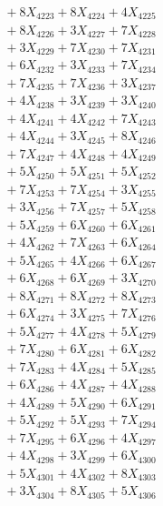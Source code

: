 \documentclass[a4paper,10pt]{article}
\begin{document}
{\begin{align}
&\;  + 8 X_{4223} + 8 X_{4224} + 4 X_{4225} \\[0.3ex]
&\;  + 8 X_{4226} + 3 X_{4227} + 7 X_{4228} \\[0.3ex]
&\;  + 3 X_{4229} + 7 X_{4230} + 7 X_{4231} \\[0.3ex]
&\;  + 6 X_{4232} + 3 X_{4233} + 7 X_{4234} \\[0.3ex]
&\;  + 7 X_{4235} + 7 X_{4236} + 3 X_{4237} \\[0.3ex]
&\;  + 4 X_{4238} + 3 X_{4239} + 3 X_{4240} \\[0.5ex]\allowbreak
&\;  + 4 X_{4241} + 4 X_{4242} + 7 X_{4243} \\[0.3ex]
&\;  + 4 X_{4244} + 3 X_{4245} + 8 X_{4246} \\[0.3ex]
&\;  + 7 X_{4247} + 4 X_{4248} + 4 X_{4249} \\[0.3ex]
&\;  + 5 X_{4250} + 5 X_{4251} + 5 X_{4252} \\[0.3ex]
&\;  + 7 X_{4253} + 7 X_{4254} + 3 X_{4255} \\[0.3ex]
&\;  + 3 X_{4256} + 7 X_{4257} + 5 X_{4258} \\[0.3ex]
&\;  + 5 X_{4259} + 6 X_{4260} + 6 X_{4261} \\[0.3ex]
&\;  + 4 X_{4262} + 7 X_{4263} + 6 X_{4264} \\[0.3ex]
&\;  + 5 X_{4265} + 4 X_{4266} + 6 X_{4267} \\[0.3ex]
&\;  + 6 X_{4268} + 6 X_{4269} + 3 X_{4270} \\[0.5ex]\allowbreak
&\;  + 8 X_{4271} + 8 X_{4272} + 8 X_{4273} \\[0.3ex]
&\;  + 6 X_{4274} + 3 X_{4275} + 7 X_{4276} \\[0.3ex]
&\;  + 5 X_{4277} + 4 X_{4278} + 5 X_{4279} \\[0.3ex]
&\;  + 7 X_{4280} + 6 X_{4281} + 6 X_{4282} \\[0.3ex]
&\;  + 7 X_{4283} + 4 X_{4284} + 5 X_{4285} \\[0.3ex]
&\;  + 6 X_{4286} + 4 X_{4287} + 4 X_{4288} \\[0.3ex]
&\;  + 4 X_{4289} + 5 X_{4290} + 6 X_{4291} \\[0.3ex]
&\;  + 5 X_{4292} + 5 X_{4293} + 7 X_{4294} \\[0.3ex]
&\;  + 7 X_{4295} + 6 X_{4296} + 4 X_{4297} \\[0.3ex]
&\;  + 4 X_{4298} + 3 X_{4299} + 6 X_{4300} \\[0.5ex]\allowbreak
&\;  + 5 X_{4301} + 4 X_{4302} + 8 X_{4303} \\[0.3ex]
&\;  + 3 X_{4304} + 8 X_{4305} + 5 X_{4306} \\[0.3ex]

\end{align}}
\end{document}
